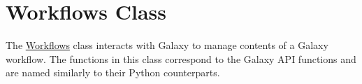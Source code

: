 \hypertarget{group__workflowa__class}{}\section{Workflows Class}
\label{group__workflowa__class}
The \hyperlink{classWorkflows}{Workflows} class interacts with Galaxy to manage contents of a Galaxy workflow. The functions in this class correspond to the Galaxy A\+PI functions and are named similarly to their Python counterparts. 
